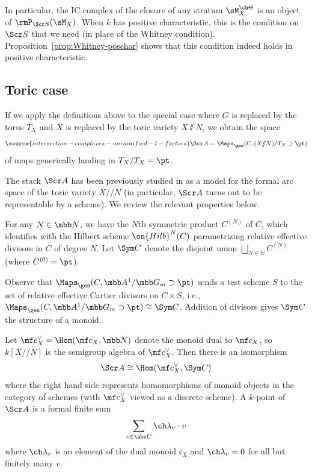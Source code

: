 In particular, the IC complex of the closure of any stratum $\sM_X^{\ch\Theta}$
is an object of $\rmP_{\Scr S}(\sM_X)$.
When $k$ has positive characteristic, this is the condition on $\Scr S$
that we need (in place of the Whitney condition).
Proposition~\ref{prop:Whitney-poschar} shows that this condition
indeed holds in positive characteristic.


\subsection{Toric case} \label{sect:baseA}
If we apply the definitions above to the special case where $G$ is replaced by the torus $T_X$ and $X$ is replaced by the toric variety $X\sslash N$, we obtain the space \begin{equation}  \label{e:defA}
\source{intersection-complexes-unramified-l-factors}
    \Scr A = \Maps_\gen(C, (X/\!\!/N)/T_X \supset \pt)
\end{equation}
of maps generically landing in $T_X/T_X=\pt$.



The stack $\Scr A$ has been previously studied in \cite[\S 3]{BNS} as
a model for the formal arc space of the toric variety $X/\!\!/N$
(in particular, $\Scr A$ turns out to be representable by a scheme).
We review the relevant properties below.

For any $N \in \mbb N$, we have the $N$th symmetric product
$C^{(N)}$ of $C$, which identifies with the Hilbert scheme $\on{Hilb}^N(C)$
parametrizing relative effective divisors in $C$ of degree $N$.
Let $\Sym C$ denote the disjoint union
$\bigsqcup_{N\in \mathbb N} C^{(N)}$ (where $C^{(0)}=\pt$).


\begin{eg}
\notready
Observe that $\Maps_\gen(C, \mbb A^1/\mbb G_m\supset \pt)$ sends a test scheme $S$ to
the set of relative effective Cartier divisors on $C \times S$, i.e.,
$\Maps_\gen(C, \mbb A^1/\mbb G_m\supset \pt) \cong \Sym C$.
Addition of divisors gives $\Sym C$ the structure of a monoid.
\end{eg}


Let $\mf c_X^\vee = \Hom(\mf c_X, \mbb N)$ denote the monoid dual
to $\mf c_X$, so $k[X/\!\!/N]$ is the semigroup algebra of $\mf c_X^\vee$.
Then there is an isomorphism
\[ \Scr A \cong \Hom(\mf c_X^\vee, \Sym C) \]
where the right hand side represents homomorphisms of monoid objects in the category of schemes
(with $\mf c_X^\vee$ viewed as a discrete scheme).
A $k$-point of $\Scr A$ is a formal finite sum
\[ \sum_{v\in \abs C} \ch\lambda_v \cdot v \]
where $\ch\lambda_v$ is an element of the dual monoid $\mathfrak c_X$ and $\ch\lambda_v=0$ for all but finitely many $v$.

